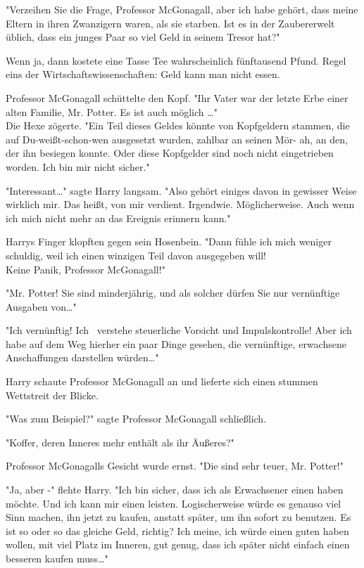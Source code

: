 {"Verzeihen Sie die Frage, Professor McGonagall, aber ich habe gehört, dass meine Eltern in ihren Zwanzigern waren, als sie starben. Ist es in der Zaubererwelt üblich, dass ein junges Paar so viel Geld in seinem Tresor hat?"

Wenn ja, dann kostete eine Tasse Tee wahrscheinlich fünftausend Pfund. Regel eins der Wirtschaftswissenschaften: Geld kann man nicht essen.

Professor McGonagall schüttelte den Kopf. "Ihr Vater war der letzte Erbe einer alten Familie, Mr. Potter. Es ist auch möglich …"\\ Die Hexe zögerte. "Ein Teil dieses Geldes könnte von Kopfgeldern stammen, die auf Du-weißt-schon-wen ausgesetzt wurden, zahlbar an seinen Mör- ah, an den, der ihn besiegen konnte. Oder diese Kopfgelder sind noch nicht eingetrieben worden. Ich bin mir nicht sicher."

"Interessant…" sagte Harry langsam. "Also gehört einiges davon in gewisser Weise wirklich mir. Das heißt, von mir verdient. Irgendwie. Möglicherweise. Auch wenn ich mich nicht mehr an das Ereignis erinnern kann."

Harrys Finger klopften gegen sein Hosenbein. "Dann fühle ich mich weniger schuldig, weil ich einen winzigen Teil davon ausgegeben will!\\ Keine Panik, Professor McGonagall!"

"Mr. Potter! Sie sind minderjährig, und als solcher dürfen Sie nur vernünftige Ausgaben von…"

"Ich vernünftig! Ich ~verstehe steuerliche Vorsicht und Impulskontrolle! Aber ich habe auf dem Weg hierher ein paar Dinge gesehen, die vernünftige, erwachsene Anschaffungen darstellen würden…"

Harry schaute Professor McGonagall an und lieferte sich einen stummen Wettstreit der Blicke.

"Was zum Beispiel?" sagte Professor McGonagall schließlich.

"Koffer, deren Inneres mehr enthält als ihr Äußeres?"

Professor McGonagalls Gesicht wurde ernst. "Die sind sehr teuer, Mr. Potter!"

"Ja, aber -" flehte Harry. "Ich bin sicher, dass ich als Erwachsener einen haben möchte. Und ich kann mir einen leisten. Logischerweise würde es genauso viel Sinn machen, ihn jetzt zu kaufen, anstatt später, um ihn sofort zu benutzen. Es ist so oder so das gleiche Geld, richtig? Ich meine, ich würde einen guten haben wollen, mit viel Platz im Inneren, gut genug, dass ich später nicht einfach einen besseren kaufen muss…"

}
